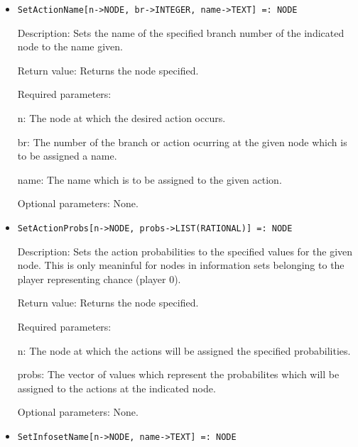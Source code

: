 \begin{itemize}
\item

\protect \large \begin{verbatim}
SetActionName[n->NODE, br->INTEGER, name->TEXT] =: NODE
\end{verbatim}\normalsize

\bd
\item
[Description:] Sets the name of the specified branch number of the 
indicated node to the name given.
\item
[Return value:] Returns the node specified.
\item
[Required parameters:]\hfil\null
	
\bd
\item
[ n:] The node at which the desired action occurs.
\item
[ br:] The number of the branch or action ocurring at the given node
which is to be assigned a name.
\item
[ name:] The name which is to be assigned to the given action.
\ed

\item
[Optional parameters:] None.

\ed

\item

\protect \large \begin{verbatim}
SetActionProbs[n->NODE, probs->LIST(RATIONAL)] =: NODE
\end{verbatim}\normalsize

\bd
\item
[Description:] Sets the action probabilities to the specified values 
for the given node.  This is only meaninful for nodes in information
sets belonging to the player representing chance (player 0).
\item
[Return value:] Returns the node specified.
\item
[Required parameters:]\hfil\null
	
\bd
\item
[ n:] The node at which the actions will be assigned the specified
probabilities.
\item
[ probs:] The vector of values which represent the probabilites 
which will be assigned to the actions at the indicated node.
\ed

\item
[Optional parameters:] None.
\ed

\item

\protect \large \begin{verbatim}
SetInfosetName[n->NODE, name->TEXT] =: NODE
\end{verbatim}\normalsize


\end{itemize}
